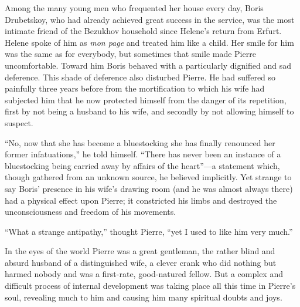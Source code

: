 Among the many young men who frequented her house every day,
Boris Drubetskoy, who had already achieved great success in the
service, was the most intimate friend of the Bezukhov household
since Helene's return from Erfurt. Helene spoke of him as
\emph{mon page} and treated him like a child. Her smile for him
was the same as for everybody, but sometimes that smile made
Pierre uncomfortable. Toward him Boris behaved with a
particularly dignified and sad deference. This shade of deference
also disturbed Pierre. He had suffered so painfully three years
before from the mortification to which his wife had subjected him
that he now protected himself from the danger of its repetition,
first by not being a husband to his wife, and secondly by not
allowing himself to suspect.

``No, now that she has become a bluestocking she has finally
renounced her former infatuations,'' he told himself. ``There has
never been an instance of a bluestocking being carried away by
affairs of the heart''---a statement which, though gathered from
an unknown source, he believed implicitly. Yet strange to say
Boris' presence in his wife's drawing room (and he was almost
always there) had a physical effect upon Pierre; it constricted
his limbs and destroyed the unconsciousness and freedom of his
movements.

``What a strange antipathy,'' thought Pierre, ``yet I used to
like him very much.''

In the eyes of the world Pierre was a great gentleman, the rather
blind and absurd husband of a distinguished wife, a clever crank
who did nothing but harmed nobody and was a first-rate,
good-natured fellow. But a complex and difficult process of
internal development was taking place all this time in Pierre's
soul, revealing much to him and causing him many spiritual doubts
and joys.


